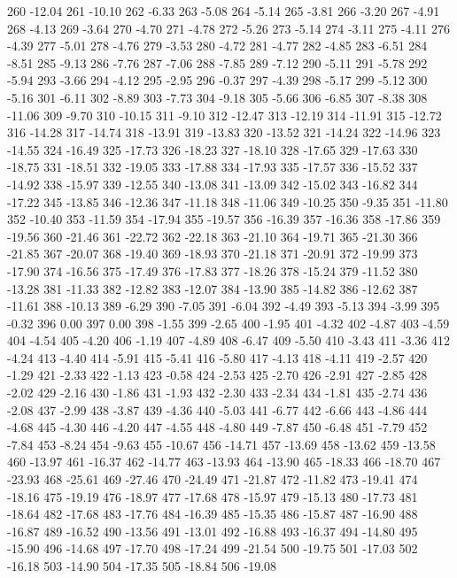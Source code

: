 260 -12.04
261 -10.10
262 -6.33
263 -5.08
264 -5.14
265 -3.81
266 -3.20
267 -4.91
268 -4.13
269 -3.64
270 -4.70
271 -4.78
272 -5.26
273 -5.14
274 -3.11
275 -4.11
276 -4.39
277 -5.01
278 -4.76
279 -3.53
280 -4.72
281 -4.77
282 -4.85
283 -6.51
284 -8.51
285 -9.13
286 -7.76
287 -7.06
288 -7.85
289 -7.12
290 -5.11
291 -5.78
292 -5.94
293 -3.66
294 -4.12
295 -2.95
296 -0.37
297 -4.39
298 -5.17
299 -5.12
300 -5.16
301 -6.11
302 -8.89
303 -7.73
304 -9.18
305 -5.66
306 -6.85
307 -8.38
308 -11.06
309 -9.70
310 -10.15
311 -9.10
312 -12.47
313 -12.19
314 -11.91
315 -12.72
316 -14.28
317 -14.74
318 -13.91
319 -13.83
320 -13.52
321 -14.24
322 -14.96
323 -14.55
324 -16.49
325 -17.73
326 -18.23
327 -18.10
328 -17.65
329 -17.63
330 -18.75
331 -18.51
332 -19.05
333 -17.88
334 -17.93
335 -17.57
336 -15.52
337 -14.92
338 -15.97
339 -12.55
340 -13.08
341 -13.09
342 -15.02
343 -16.82
344 -17.22
345 -13.85
346 -12.36
347 -11.18
348 -11.06
349 -10.25
350 -9.35
351 -11.80
352 -10.40
353 -11.59
354 -17.94
355 -19.57
356 -16.39
357 -16.36
358 -17.86
359 -19.56
360 -21.46
361 -22.72
362 -22.18
363 -21.10
364 -19.71
365 -21.30
366 -21.85
367 -20.07
368 -19.40
369 -18.93
370 -21.18
371 -20.91
372 -19.99
373 -17.90
374 -16.56
375 -17.49
376 -17.83
377 -18.26
378 -15.24
379 -11.52
380 -13.28
381 -11.33
382 -12.82
383 -12.07
384 -13.90
385 -14.82
386 -12.62
387 -11.61
388 -10.13
389 -6.29
390 -7.05
391 -6.04
392 -4.49
393 -5.13
394 -3.99
395 -0.32
396 0.00
397 0.00
398 -1.55
399 -2.65
400 -1.95
401 -4.32
402 -4.87
403 -4.59
404 -4.54
405 -4.20
406 -1.19
407 -4.89
408 -6.47
409 -5.50
410 -3.43
411 -3.36
412 -4.24
413 -4.40
414 -5.91
415 -5.41
416 -5.80
417 -4.13
418 -4.11
419 -2.57
420 -1.29
421 -2.33
422 -1.13
423 -0.58
424 -2.53
425 -2.70
426 -2.91
427 -2.85
428 -2.02
429 -2.16
430 -1.86
431 -1.93
432 -2.30
433 -2.34
434 -1.81
435 -2.74
436 -2.08
437 -2.99
438 -3.87
439 -4.36
440 -5.03
441 -6.77
442 -6.66
443 -4.86
444 -4.68
445 -4.30
446 -4.20
447 -4.55
448 -4.80
449 -7.87
450 -6.48
451 -7.79
452 -7.84
453 -8.24
454 -9.63
455 -10.67
456 -14.71
457 -13.69
458 -13.62
459 -13.58
460 -13.97
461 -16.37
462 -14.77
463 -13.93
464 -13.90
465 -18.33
466 -18.70
467 -23.93
468 -25.61
469 -27.46
470 -24.49
471 -21.87
472 -11.82
473 -19.41
474 -18.16
475 -19.19
476 -18.97
477 -17.68
478 -15.97
479 -15.13
480 -17.73
481 -18.64
482 -17.68
483 -17.76
484 -16.39
485 -15.35
486 -15.87
487 -16.90
488 -16.87
489 -16.52
490 -13.56
491 -13.01
492 -16.88
493 -16.37
494 -14.80
495 -15.90
496 -14.68
497 -17.70
498 -17.24
499 -21.54
500 -19.75
501 -17.03
502 -16.18
503 -14.90
504 -17.35
505 -18.84
506 -19.08
